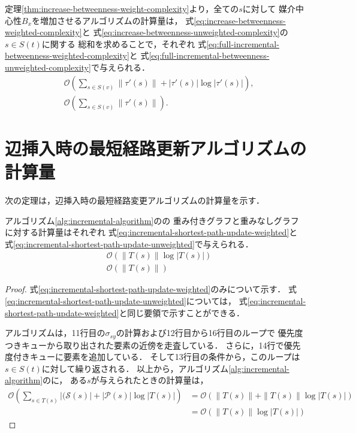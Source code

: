 定理\ref{thm:increase-betweenness-weight-complexity}より，全ての$s$に対して
媒介中心性$B_x$を増加させるアルゴリズムの計算量は，
式\eqref{eq:increase-betweenness-weighted-complexity}と
式\eqref{eq:increase-betweenness-unweighted-complexity}の$s\in S(t)$に関する
総和を求めることで，それぞれ
式\eqref{eq:full-incremental-betweenness-weighted-complexity}と
式\eqref{eq:full-incremental-betweenness-unweighted-complexity}で与えられる．
\begin{align}
  &\mathcal{O}\left(\sum_{s\in S(v)}\|\tau'(s)\|+|\tau'(s)|\log|\tau'(s)|\right),
  \label{eq:full-incremental-betweenness-weighted-complexity} \\
  &\mathcal{O}\left(\sum_{s\in S(v)}\|\tau'(s)\|\right).
  \label{eq:full-incremental-betweenness-unweighted-complexity}
\end{align}

\section{辺挿入時の最短経路更新アルゴリズムの計算量}
次の定理は，辺挿入時の最短経路変更アルゴリズムの計算量を示す．

\begin{theorem}
  \label{thm:incremental-shortest-path-update}
  アルゴリズム\ref{alg:incremental-algorithm}のの
  重み付きグラフと重みなしグラフに対する計算量はそれぞれ
  式\eqref{eq:incremental-shortest-path-update-weighted}と
  式\eqref{eq:incremental-shortest-path-update-unweighted}で与えられる．
  \begin{align}
    &\mathcal{O}\left(\|T(s)\|\log|T(s)|\right)
    \label{eq:incremental-shortest-path-update-weighted} \\
    &\mathcal{O}\left(\|T(s)\|\right)
    \label{eq:incremental-shortest-path-update-unweighted}
  \end{align}
\end{theorem}
\begin{proof}
  式\eqref{eq:incremental-shortest-path-update-weighted}のみについて示す．
  式\eqref{eq:incremental-shortest-path-update-unweighted}については，
  式\eqref{eq:incremental-shortest-path-update-weighted}と同じ要領で示すことができる．

  アルゴリズムは，11行目の$\sigma_{sy}$の計算および12行目から16行目のループで
  優先度つきキューから取り出された要素の近傍を走査している．
  さらに，14行で優先度付きキューに要素を追加している．
  そして13行目の条件から，このループは$s\in S(t)$に対して繰り返される．
  以上から，アルゴリズム\ref{alg:incremental-algorithm}のに，
  ある$s$が与えられたときの計算量は，
  \begin{equation*}
    \begin{aligned}
      \mathcal{O}\left(\sum_{s\in T(s)}|(\mathcal{S}(s)|+|\mathcal{P}(s)|\log|T(s)|\right)
      &=\mathcal{O}(\|T(s)\|+\|T(s)\|\log|T(s)|) \\
      &=\mathcal{O}(\|T(s)\|\log|T(s)|)
    \end{aligned}
  \end{equation*}
\end{proof}

